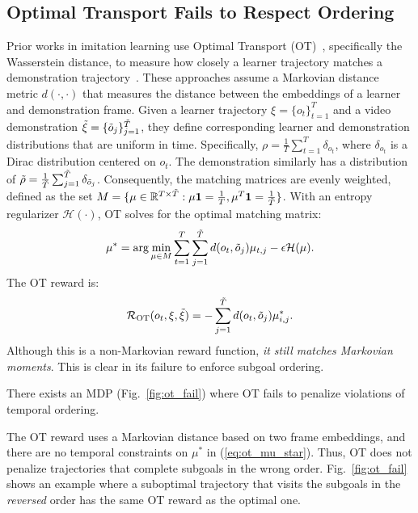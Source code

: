 \subsection{Optimal Transport Fails to Respect Ordering}
\label{subsec:ot_fail}
Prior works in imitation learning use Optimal Transport (OT)~\cite{peyré2020computationaloptimaltransport}, specifically the 
Wasserstein distance, to measure how closely a learner trajectory matches a demonstration trajectory~\citep{papagiannis2022imitation, tian2024what, fu2024robot, kedia2024oneshotimitationmismatchedexecution}.
These approaches assume a Markovian distance metric $d(\cdot,\cdot)$ that measures the distance between the embeddings of a learner and demonstration frame. 
Given a learner trajectory $\xi = \{o_{t}\}^{T}_{t=1}$ and a video demonstration $\tilde{\xi} = \{\tilde{o}_j\}^{\tilde{T}}_{j=1}$, they define corresponding learner and demonstration distributions that are uniform in time. Specifically, $\rho = \frac{1}{T} \sum^{T}_{t=1} \delta_{o_t}$, where $\delta_{o_t}$ is a Dirac distribution centered on $o_t$. 
The demonstration similarly has a distribution of $\tilde{\rho} = \frac{1}{\tilde{T}} \sum^{\tilde{T}}_{j=1} \delta_{\tilde{o}_{j}}$. 
Consequently, the matching matrices are evenly weighted, defined as the set $M = \{\mu \in \mathbb{R}^{T \times \tilde{T}}: \mu \mathbf{1} = \frac{1}{T}, \mu^T \mathbf{1} = \frac{1}{\tilde{T}}\}$.
With an entropy regularizer $\mathcal{H(\cdot)}$, OT solves for the optimal matching matrix:
\begin{equation}\label{eq:ot_mu_star}
    \mu^* = \arg\min_{\mu \in M} \sum_{t=1}^{T}\sum_{j=1}^{\tilde{T}} d(o_t, \tilde{o}_j) \mu_{t, j} - \epsilon \mathcal{H}(\mu).
\end{equation}
The OT reward is:
\begin{equation}\label{eq:distr_rew}
     \mathcal{R}_\text{OT}(o_t,\xi, \tilde{\xi}) = - \sum_{j=1}^{\tilde{T}} d(o_t,\tilde{o}_j) \mu^*_{i,j}.
\end{equation}
Although this is a non-Markovian reward function, \textit{it still matches Markovian moments}. This is clear in its failure to enforce subgoal ordering.
\begin{counterexample}
There exists an MDP (Fig.~\ref{fig:ot_fail}) where OT fails to penalize violations of temporal ordering.
\end{counterexample}
The OT reward uses a Markovian distance based on two frame embeddings, and there are no temporal constraints on $\mu^*$ in (\ref{eq:ot_mu_star}).
Thus, OT does not penalize trajectories that complete subgoals in the wrong order. Fig.~\ref{fig:ot_fail} shows an example where a suboptimal trajectory that visits the subgoals in the \emph{reversed} order has the same OT reward as the optimal one. 

